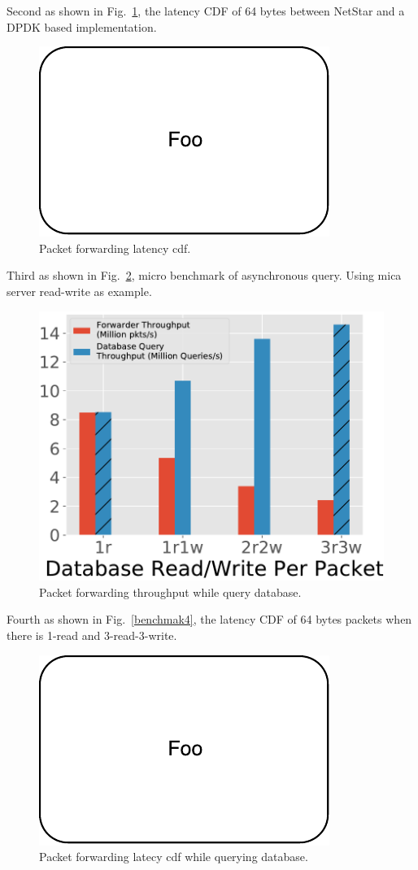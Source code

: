 Second as shown in Fig.~\ref{benchmark2}, the latency CDF of 64 bytes between NetStar and a DPDK based implementation.

\begin{figure}[!t]
  \centering
  \includegraphics[width=0.5\columnwidth]{figure/foo.pdf}

  \caption{Packet forwarding latency cdf.}
  \label{benchmark2}

\end{figure}

Third as shown in Fig.~\ref{benchmark3}, micro benchmark of asynchronous query. Using mica server read-write as example.

\begin{figure}[!t]
  \centering
  \includegraphics[width=0.5\columnwidth]{figure/micro_latency.pdf}

  \caption{Packet forwarding throughput while query database.}
  \label{benchmark3}

\end{figure}

Fourth as shown in Fig.~\ref{benchmak4}, the latency CDF of 64 bytes packets when there is 1-read and 3-read-3-write.

\begin{figure}[!t]
  \centering
  \includegraphics[width=0.5\columnwidth]{figure/foo.pdf}

  \caption{Packet forwarding latecy cdf while querying database.}
  \label{benchmark4}

\end{figure}

